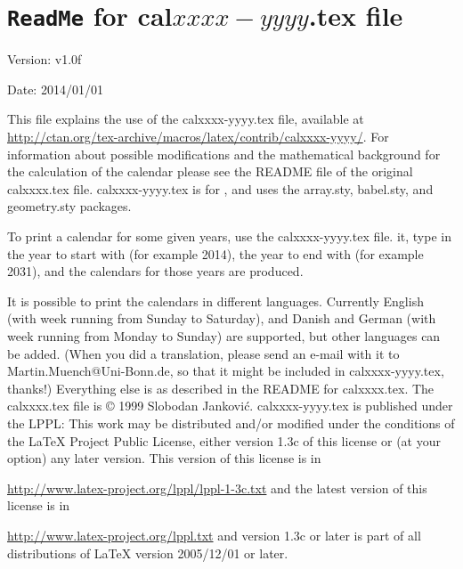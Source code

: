 \documentclass{article}
\begin{document}
\section*{\texttt{ReadMe} for cal$xxxx-yyyy$.tex file}

Version: v1.0f

\noindent Date: 2014/01/01\newline

This file explains the use of the \textsf{calxxxx-yyyy.tex} file,
available at\newline
\url{http://ctan.org/tex-archive/macros/latex/contrib/calxxxx-yyyy/}.\newline
\noindent For information about possible modifications and the mathematical background
for the calculation of the calendar please see the README file of the original
\textsf{calxxxx.tex} file. \textsf{calxxxx-yyyy.tex} is for \LaTeXe, and uses
the \textsf{array.sty}, \textsf{babel.sty}, and \textsf{geometry.sty} packages.

\hspace*{-1.98471pt}To print a calendar for some given years,
use the \textsf{calxxxx-yyyy.tex} file. \LaTeXe{} it, type in the year to start with
(for example 2014), the year to end with (for example 2031), and the calendars
for those years are produced.

It is possible to print the calendars in different languages. Currently
English (with week running from Sunday to Saturday),
and Danish and German (with week running from Monday to Sunday) are supported,
but other languages can be added. (When you did a translation, please send
an e-mail with it to {\nolinebreak Martin.Muench@Uni-Bonn.de,}
so that it might be included in \textsf{calxxxx-yyyy.tex}, thanks!)\newline
Everything else is as described in the README for \textsf{calxxxx.tex}.\newline
The \textsf{calxxxx.tex} file is \copyright{} 1999 Slobodan Jankovi\'{c}.\newline
\textsf{calxxxx-yyyy.tex} is published under the LPPL: This work may be
distributed and/or modified under the conditions of the \LaTeX{} Project
Public License, either version 1.3c of this license or (at your option) any
later version. This version of this license is in

\url{http://www.latex-project.org/lppl/lppl-1-3c.txt}\newline
and the latest version of this license is in

\url{http://www.latex-project.org/lppl.txt}\newline
and version 1.3c or later is part of all distributions of \LaTeX{} version
2005/12/01 or later.
\end{document}
